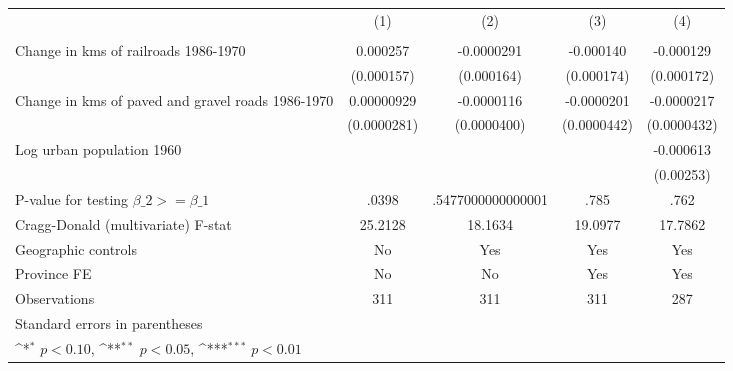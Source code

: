 {
\def\sym#1{\ifmmode^{#1}\else\(^{#1}\)\fi}
\begin{tabular}{l*{4}{c}}
\hline\hline
                &\multicolumn{1}{c}{(1)}&\multicolumn{1}{c}{(2)}&\multicolumn{1}{c}{(3)}&\multicolumn{1}{c}{(4)}\\
                &\multicolumn{1}{c}{}&\multicolumn{1}{c}{}&\multicolumn{1}{c}{}&\multicolumn{1}{c}{}\\
\hline
Change in kms of railroads 1986-1970& 0.000257         &-0.0000291         &-0.000140         &-0.000129         \\
                &(0.000157)         &(0.000164)         &(0.000174)         &(0.000172)         \\
[1em]
Change in kms of paved and gravel roads 1986-1970&0.00000929         &-0.0000116         &-0.0000201         &-0.0000217         \\
                &(0.0000281)         &(0.0000400)         &(0.0000442)         &(0.0000432)         \\
[1em]
Log urban population 1960&                  &                  &                  &-0.000613         \\
                &                  &                  &                  &(0.00253)         \\
\hline
P-value for testing $\beta\_{2} >= \beta\_{1}$&    .0398         &.5477000000000001         &     .785         &     .762         \\
Cragg-Donald (multivariate) F-stat&  25.2128         &  18.1634         &  19.0977         &  17.7862         \\
Geographic controls&       No         &      Yes         &      Yes         &      Yes         \\
Province FE     &       No         &       No         &      Yes         &      Yes         \\
Observations    &      311         &      311         &      311         &      287         \\
\hline\hline
\multicolumn{5}{l}{\footnotesize Standard errors in parentheses}\\
\multicolumn{5}{l}{\footnotesize \sym{*} \(p<0.10\), \sym{**} \(p<0.05\), \sym{***} \(p<0.01\)}\\
\end{tabular}
}
